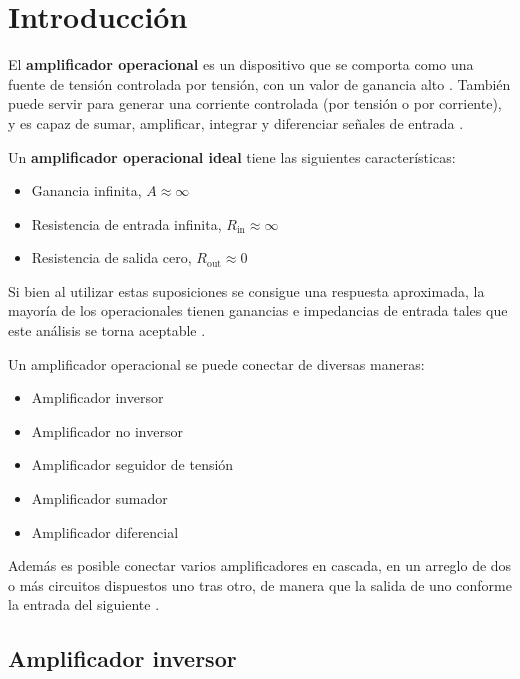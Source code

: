 \section{Introducción}
\label{sec:intro}

El \textbf{amplificador operacional} es un dispositivo que se comporta como una fuente de tensión controlada por tensión, con un valor de ganancia alto \cite[pág. 107]{huelsman}. También puede servir para generar una corriente controlada (por tensión o por corriente), y es capaz de sumar, amplificar, integrar y diferenciar señales de entrada \cite[pág. 176]{FDCE}. 


Un \textbf{amplificador operacional ideal} tiene las siguientes características:

\begin{itemize}
    \item Ganancia infinita, $A\approx\infty$
    \item Resistencia de entrada infinita, $R_{\text{in}} \approx \infty$
    \item Resistencia de salida cero, $R_{\text{out}} \approx 0$
\end{itemize}

Si bien al utilizar estas suposiciones se consigue una respuesta aproximada, la mayoría de los operacionales tienen ganancias e impedancias de entrada tales que este análisis se torna aceptable \cite[pág. 180]{FDCE}.

Un amplificador operacional se puede conectar de diversas maneras:

\begin{itemize}
    \item Amplificador inversor
    \item Amplificador no inversor
    \item Amplificador seguidor de tensión
    \item Amplificador sumador
    \item Amplificador diferencial
\end{itemize}

Además es posible conectar varios amplificadores en cascada, en un arreglo de dos o más circuitos dispuestos uno tras otro, de manera que la salida de uno conforme la entrada del siguiente \cite[pág. 191]{FDCE}.

\subsection{Amplificador inversor}
\label{sec:intro:opamp-inversor}

